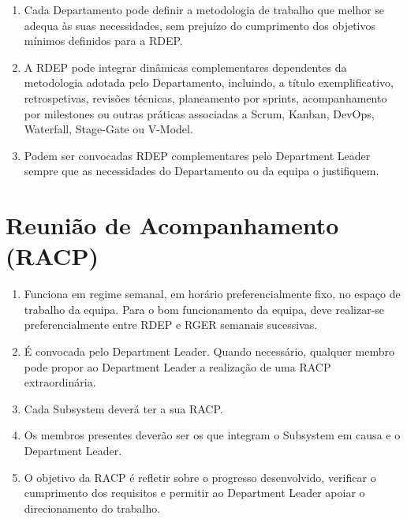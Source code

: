 \begin{enumerate}
\begin{enumerate}
\begin{enumerate}
      \item Definir os Reviewers para as tarefas.
      \item Descrever detalhadamente o objetivo e os requisitos de cada tarefa a executar.
    \end{enumerate}
  \end{enumerate}
  \item Cada Departamento pode definir a metodologia de trabalho que melhor se adequa às suas necessidades, sem prejuízo do cumprimento dos objetivos mínimos definidos para a RDEP.
  \item A RDEP pode integrar dinâmicas complementares dependentes da metodologia adotada pelo Departamento, incluindo, a título exemplificativo, retrospetivas, revisões técnicas, planeamento por sprints, acompanhamento por milestones ou outras práticas associadas a Scrum, Kanban, DevOps, Waterfall, Stage-Gate ou V-Model.
  \item Podem ser convocadas RDEP complementares pelo Department Leader sempre que as necessidades do Departamento ou da equipa o justifiquem.
\end{enumerate}

\section{Reunião de Acompanhamento (RACP)}
\begin{enumerate}
  \item Funciona em regime semanal, em horário preferencialmente fixo, no espaço de trabalho da equipa. Para o bom funcionamento da equipa, deve realizar-se preferencialmente entre RDEP e RGER semanais sucessivas.
  \item É convocada pelo Department Leader. Quando necessário, qualquer membro pode propor ao Department Leader a realização de uma RACP extraordinária.
  \item Cada Subsystem deverá ter a sua RACP.
  \item Os membros presentes deverão ser os que integram o Subsystem em causa e o Department Leader.
  \item O objetivo da RACP é refletir sobre o progresso desenvolvido, verificar o cumprimento dos requisitos e permitir ao Department Leader apoiar o direcionamento do trabalho.
\end{enumerate}

